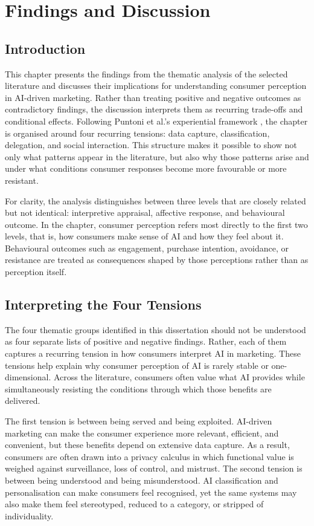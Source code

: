 \chapter{Findings and Discussion}

\section{Introduction}
This chapter presents the findings from the thematic analysis of the selected literature and discusses their implications for understanding consumer perception in AI-driven marketing. Rather than treating positive and negative outcomes as contradictory findings, the discussion interprets them as recurring trade-offs and conditional effects. Following Puntoni et al.'s experiential framework \cite{puntoni2021experiential}, the chapter is organised around four recurring tensions: data capture, classification, delegation, and social interaction. This structure makes it possible to show not only what patterns appear in the literature, but also why those patterns arise and under what conditions consumer responses become more favourable or more resistant.

For clarity, the analysis distinguishes between three levels that are closely related but not identical: interpretive appraisal, affective response, and behavioural outcome. In the chapter, consumer perception refers most directly to the first two levels, that is, how consumers make sense of AI and how they feel about it. Behavioural outcomes such as engagement, purchase intention, avoidance, or resistance are treated as consequences shaped by those perceptions rather than as perception itself.

\section{Interpreting the Four Tensions}
The four thematic groups identified in this dissertation should not be understood as four separate lists of positive and negative findings. Rather, each of them captures a recurring tension in how consumers interpret AI in marketing. These tensions help explain why consumer perception of AI is rarely stable or one-dimensional. Across the literature, consumers often value what AI provides while simultaneously resisting the conditions through which those benefits are delivered.

The first tension is between being served and being exploited. AI-driven marketing can make the consumer experience more relevant, efficient, and convenient, but these benefits depend on extensive data capture. As a result, consumers are often drawn into a privacy calculus in which functional value is weighed against surveillance, loss of control, and mistrust. The second tension is between being understood and being misunderstood. AI classification and personalisation can make consumers feel recognised, yet the same systems may also make them feel stereotyped, reduced to a category, or stripped of individuality.

